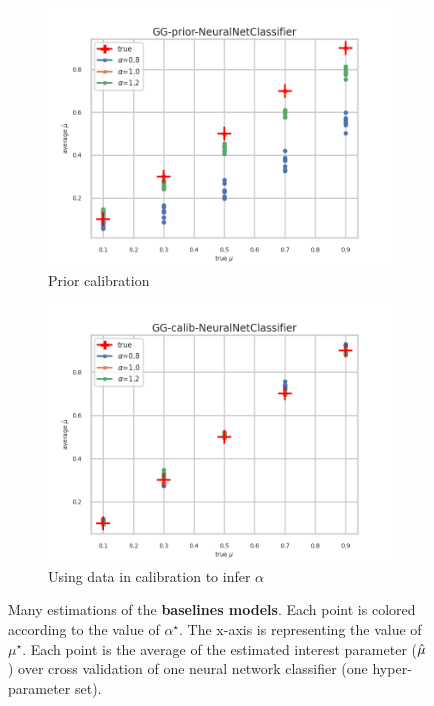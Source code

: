 \begin{figure}[ht!]
  \begin{subfigure}[t]{0.49\linewidth}
    \includegraphics[width=\linewidth]{COMPARE/GG-prior/NeuralNetClassifier/profusion_true_mu_target_mean.png}
    \caption{Prior calibration}
  \end{subfigure}%
  \hfill
  \begin{subfigure}[t]{0.49\linewidth}
    \includegraphics[width=\linewidth]{COMPARE/GG-calib/NeuralNetClassifier/profusion_true_mu_target_mean.png}
    \caption{Using data in calibration to infer $\alpha$}
  \end{subfigure}

  \caption{Many estimations of the \textbf{baselines models}. Each point is colored according to the value of $\alpha^\star$. The x-axis is representing the value of $\mu^\star$. Each point is the average of the estimated interest parameter ($\hat\mu$) over cross validation of one neural network classifier (one hyper-parameter set).}
  \label{fig:gg_baseline_compare_calib_estimator}
\end{figure}

